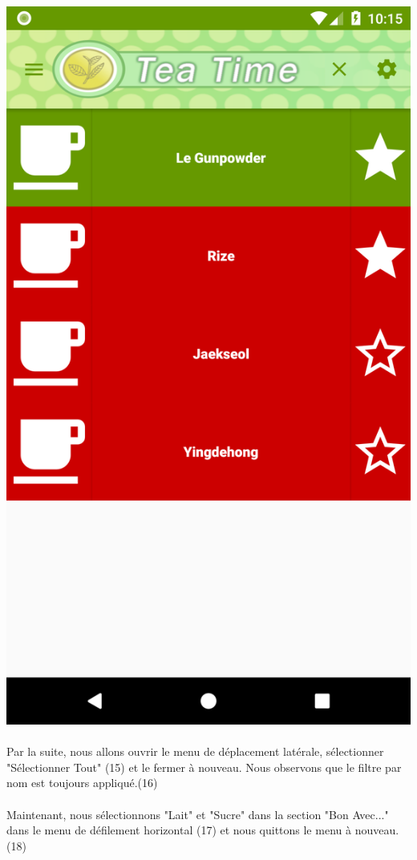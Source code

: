\documentclass[a4paper,12pt]{article}
\begin{document}
\begin{spacing}{1}
	\includegraphics*[scale=0.1]{Screenshot/18.png}\\\\
	Par la suite, nous allons ouvrir le menu de déplacement latérale, sélectionner "Sélectionner Tout" (15) et le fermer à nouveau. Nous observons que le filtre par nom est toujours appliqué.(16)\\\\
	Maintenant, nous sélectionnons "Lait" et "Sucre" dans la section "Bon Avec..." dans le menu de défilement horizontal (17) et nous quittons le menu à nouveau. (18)

\end{spacing}
\end{document}
